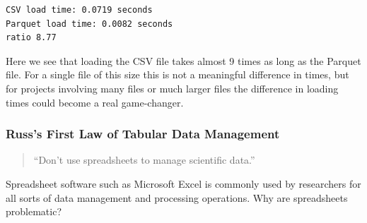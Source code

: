 \begin{lstlisting}[style=shellshort]
CSV load time: 0.0719 seconds
Parquet load time: 0.0082 seconds
ratio 8.77
\end{lstlisting}

Here we see that loading the CSV file takes almost 9 times as long as the Parquet file.  For a single file of this size this is not a meaningful difference in times, but for projects involving many files or much larger files the difference in loading times could become a real game-changer.

\subsubsection{Russ's First Law of Tabular Data Management}

\begin{quote}
``Don't use spreadsheets to manage scientific data.''
\end{quote}

Spreadsheet software such as Microsoft Excel is commonly used by researchers for all sorts of data management and processing operations.  Why are spreadsheets problematic?

